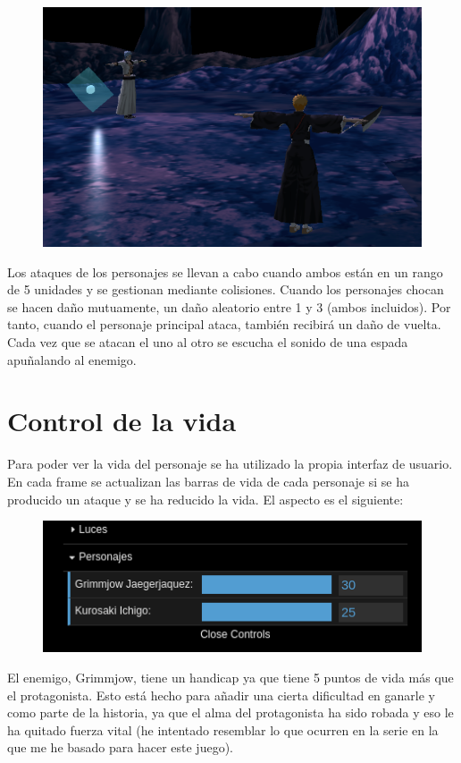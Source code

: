 \documentclass[11pt,a4paper]{article}
\begin{document}
\begin{figure}[H]
	\centering
	\includegraphics[scale=0.37]{img/inicio.png}
\end{figure}

Los ataques de los personajes se llevan a cabo cuando ambos están en un rango de 5 unidades y se gestionan mediante colisiones. Cuando los personajes chocan se hacen daño mutuamente, un daño aleatorio entre 1 y 3 (ambos incluidos). Por tanto, cuando el personaje principal ataca, también recibirá un daño de vuelta. Cada vez que se atacan el uno al otro se escucha el sonido de una espada apuñalando al enemigo.

\section{Control de la vida}

Para poder ver la vida del personaje se ha utilizado la propia interfaz de usuario. En cada frame se actualizan las barras de vida de cada personaje si se ha producido un ataque y se ha reducido la vida. El aspecto es el siguiente:

\begin{figure}[H]
	\centering
	\includegraphics[scale=0.5]{img/barravida.png}
\end{figure}

El enemigo, Grimmjow, tiene un handicap ya que tiene 5 puntos de vida más que el protagonista. Esto está hecho para añadir una cierta dificultad en ganarle y como parte de la historia, ya que el alma del protagonista ha sido robada y eso le ha quitado fuerza vital (he intentado resemblar lo que ocurren en la serie en la que me he basado para hacer este juego).\\
\end{document}
